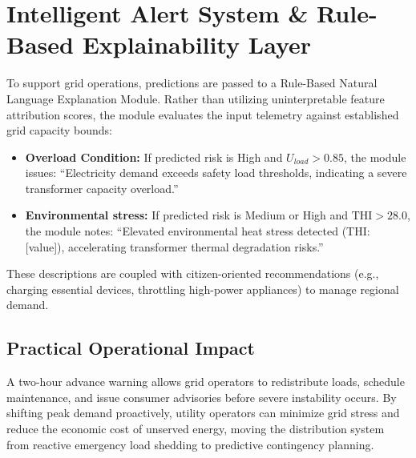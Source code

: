 \section{Intelligent Alert System \& Rule-Based Explainability Layer}
To support grid operations, predictions are passed to a Rule-Based Natural Language Explanation Module. Rather than utilizing uninterpretable feature attribution scores, the module evaluates the input telemetry against established grid capacity bounds:
\begin{itemize}
    \item \textbf{Overload Condition:} If predicted risk is High and $U_{load} > 0.85$, the module issues: ``Electricity demand exceeds safety load thresholds, indicating a severe transformer capacity overload.''
    \item \textbf{Environmental stress:} If predicted risk is Medium or High and $\text{THI} > 28.0$, the module notes: ``Elevated environmental heat stress detected (THI: [value]), accelerating transformer thermal degradation risks.''
\end{itemize}
These descriptions are coupled with citizen-oriented recommendations (e.g., charging essential devices, throttling high-power appliances) to manage regional demand.

\subsection{Practical Operational Impact}
A two-hour advance warning allows grid operators to redistribute loads, schedule maintenance, and issue consumer advisories before severe instability occurs. By shifting peak demand proactively, utility operators can minimize grid stress and reduce the economic cost of unserved energy, moving the distribution system from reactive emergency load shedding to predictive contingency planning.
